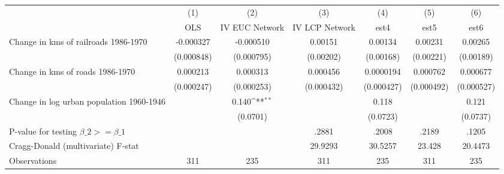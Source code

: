 {
\def\sym#1{\ifmmode^{#1}\else\(^{#1}\)\fi}
\begin{tabular}{l*{6}{c}}
\hline\hline
                &\multicolumn{1}{c}{(1)}&\multicolumn{1}{c}{(2)}&\multicolumn{1}{c}{(3)}&\multicolumn{1}{c}{(4)}&\multicolumn{1}{c}{(5)}&\multicolumn{1}{c}{(6)}\\
                &\multicolumn{1}{c}{OLS}&\multicolumn{1}{c}{IV EUC Network}&\multicolumn{1}{c}{IV LCP Network}&\multicolumn{1}{c}{est4}&\multicolumn{1}{c}{est5}&\multicolumn{1}{c}{est6}\\
\hline
Change in kms of railroads 1986-1970&-0.000327         &-0.000510         &  0.00151         &  0.00134         &  0.00231         &  0.00265         \\
                &(0.000848)         &(0.000795)         &(0.00202)         &(0.00168)         &(0.00221)         &(0.00189)         \\
[1em]
Change in kms of roads 1986-1970& 0.000213         & 0.000313         & 0.000456         &0.0000194         & 0.000762         & 0.000677         \\
                &(0.000247)         &(0.000253)         &(0.000432)         &(0.000427)         &(0.000492)         &(0.000527)         \\
[1em]
Change in log urban population 1960-1946&                  &    0.140\sym{**} &                  &    0.118         &                  &    0.121         \\
                &                  & (0.0701)         &                  & (0.0723)         &                  & (0.0737)         \\
\hline
P-value for testing $\beta\_{2} >= \beta\_{1}$&                  &                  &    .2881         &    .2008         &    .2189         &    .1205         \\
Cragg-Donald (multivariate) F-stat&                  &                  &  29.9293         &  30.5257         &   23.428         &  20.4473         \\
Observations    &      311         &      235         &      311         &      235         &      311         &      235         \\
\hline\hline
\end{tabular}
}
